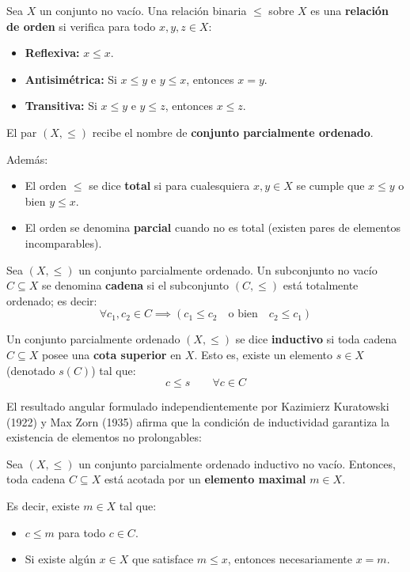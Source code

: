 \begin{definición}
    Sea $X$ un conjunto no vacío. Una relación binaria $\leq$ sobre $X$ es una \textbf{relación de orden} si verifica para todo $x, y, z \in X$:
    \begin{itemize}
        \item \textbf{Reflexiva:} $x \leq x$.
        \item \textbf{Antisimétrica:} Si $x \leq y$ e $y \leq x$, entonces $x = y$.
        \item \textbf{Transitiva:} Si $x \leq y$ e $y \leq z$, entonces $x \leq z$.
    \end{itemize}
    El par $(X, \leq)$ recibe el nombre de \textbf{conjunto parcialmente ordenado}.
    
    Además:
    \begin{itemize}
        \item El orden $\leq$ se dice \textbf{total} si para cualesquiera $x, y \in X$ se cumple que $x \leq y$ o bien $y \leq x$.
        \item El orden se denomina \textbf{parcial} cuando no es total (existen pares de elementos incomparables).
    \end{itemize}
\end{definición}

\begin{definición}[Cadena]
    Sea $(X, \leq)$ un conjunto parcialmente ordenado. Un subconjunto no vacío $C \subseteq X$ se denomina \textbf{cadena} si el subconjunto $(C, \leq)$ está totalmente ordenado; es decir:
    \[
        \forall c_1, c_2 \in C \implies (c_1 \leq c_2 \quad \text{o bien} \quad c_2 \leq c_1)
    \]
\end{definición}

\begin{definición}
    Un conjunto parcialmente ordenado $(X, \leq)$ se dice \textbf{inductivo} si toda cadena $C \subseteq X$ posee una \textbf{cota superior} en $X$. Esto es, existe un elemento $s \in X$ (denotado $s(C)$) tal que:
    \[
        c \leq s \qquad \forall c \in C
    \]
\end{definición}

El resultado angular formulado independientemente por Kazimierz Kuratowski (1922) y Max Zorn (1935) afirma que la condición de inductividad garantiza la existencia de elementos no prolongables:

\begin{lema}
    Sea $(X, \leq)$ un conjunto parcialmente ordenado inductivo no vacío. Entonces, toda cadena $C \subseteq X$ está acotada por un \textbf{elemento maximal} $m \in X$.
    
    Es decir, existe $m \in X$ tal que:
    \begin{itemize}
        \item $c \leq m$ para todo $c \in C$.
        \item Si existe algún $x \in X$ que satisface $m \leq x$, entonces necesariamente $x = m$.
    \end{itemize}
\end{lema}

